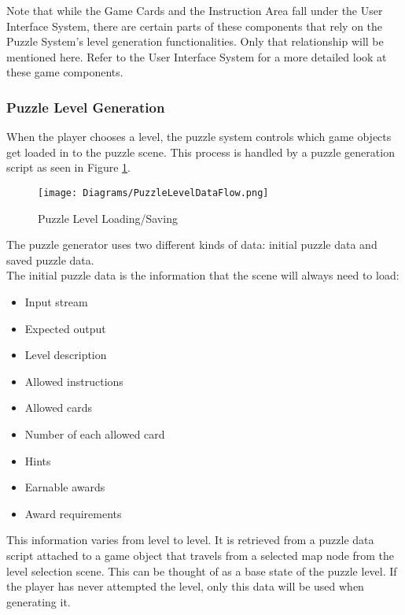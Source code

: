 Note that while the Game Cards and the Instruction Area fall under the User
Interface System, there are certain parts of these components that rely on
the Puzzle System’s level generation functionalities. Only that relationship
will be mentioned here. Refer to the User Interface System for a more detailed
look at these game components.

\subsubsection{Puzzle Level Generation}
When the player chooses a level, the puzzle system controls
which game objects get loaded in to the puzzle scene. This process is handled
by a puzzle generation script as seen in Figure \ref{fig:puzzle_level_data_flow}.\\

\begin{figure}[t]
  \caption{Puzzle Level Loading/Saving}
  \label{fig:puzzle_level_data_flow}
  \centering
  \texttt{[image: Diagrams/PuzzleLevelDataFlow.png]}
\end{figure}
\vfill

The puzzle generator uses two different kinds of data: initial puzzle data and saved puzzle data.\\

The initial puzzle data is the information that the scene will always need to load:
\begin{itemize}
  \item Input stream
  \item Expected output
  \item Level description
  \item Allowed instructions
  \item Allowed cards
  \item Number of each allowed card
  \item Hints
  \item Earnable awards
  \item Award requirements
\end{itemize}

This information varies from level to level. It is retrieved from a puzzle data script attached to
a game object that travels from a selected map node from the level selection scene. This can be
thought of as a base state of the puzzle level. If the player has never attempted the level, only
this data will be used when generating it.\\

